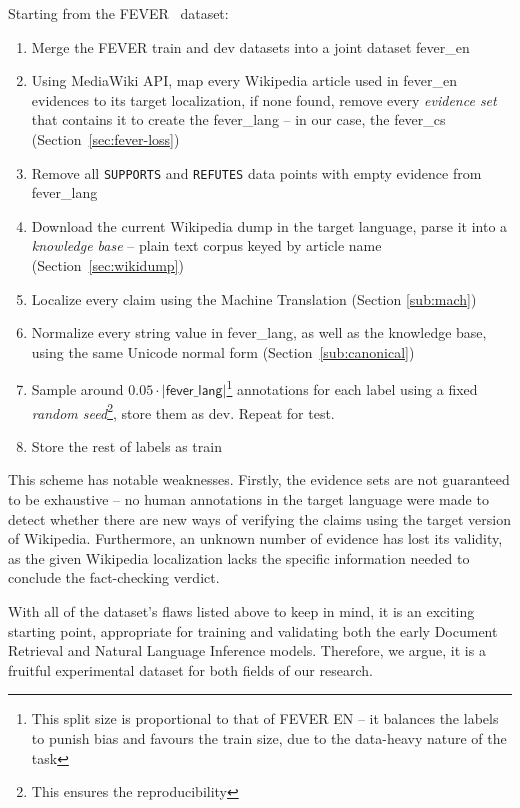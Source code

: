 Starting from the \textsf{FEVER}~\cite{fever} dataset:
\begin{enumerate}
    \item Merge the \textsf{FEVER} \textsf{train} and \textsf{dev} datasets into a joint dataset \textsf{fever\_en}
    \item Using \textsf{MediaWiki API}, map every \textsf{Wikipedia} article used in \textsf{fever\_en} evidences to its target localization, if none found, remove every \textit{evidence set} that contains it to create the \textsf{fever\_lang} -- in our case, the \textsf{fever\_cs} (Section~\ref{sec:fever-loss})
    \item Remove all \texttt{SUPPORTS} and \texttt{REFUTES} data points with empty evidence from \textsf{fever\_lang} 
        \item Download the current \textsf{Wikipedia} dump in the target language, parse it into a \textit{knowledge base} -- plain text corpus keyed by article name (Section~\ref{sec:wikidump})
    \item Localize every claim using the Machine Translation (Section \ref{sub:mach})
    \item Normalize every string value in \textsf{fever\_lang}, as well as the knowledge base, using the same Unicode normal form (Section~\ref{sub:canonical})
    \item Sample around $0.05\cdot|\textsf{fever\_lang}|$\footnote{This split size is proportional to that of \textsf{FEVER EN} -- it balances the labels to punish bias and favours the \textsf{train} size, due to the data-heavy nature of the task} annotations for each label using a fixed \textit{random seed}\footnote{This ensures the reproducibility}, store them as \textsf{dev}. Repeat for \textsf{test}.
    \item Store the rest of labels as \textsf{train}
\end{enumerate}

This scheme has notable weaknesses. Firstly, the evidence sets are not guaranteed to be exhaustive -- no human annotations in the target language were made to detect whether there are new ways of verifying the claims using the target version of \textsf{Wikipedia}. Furthermore, an unknown number of evidence has lost its validity, as the given \textsf{Wikipedia} localization lacks the specific information needed to conclude the fact-checking verdict.

With all of the dataset's flaws listed above to keep in mind, it is an exciting starting point, appropriate for training and validating both the early Document Retrieval and Natural Language Inference models. Therefore, we argue, it is a fruitful experimental dataset for both fields of our research.


